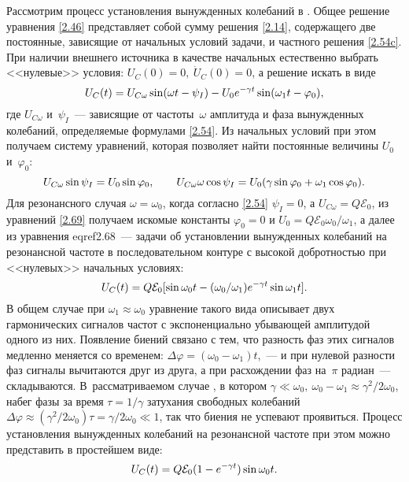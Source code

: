 Рассмотрим процесс установления вынужденных колебаний в
. Общее решение уравнения
\eqref{2.46} представляет собой сумму решения \eqref{2.14}, содержащего две
постоянные, зависящие от начальных условий задачи, и частного решения
\eqref{2.54c}. При наличии внешнего источника в качестве начальных естественно
выбрать <<нулевые>> условия: $U_C(0)=0,~\dot U_C(0)=0$, а решение искать в виде
\begin{equation}
	\eqmark{2.68}
	U_C(t)=U_{C\omega}\sin(\omega t-\psi_I)-U_0e^{-\gamma
t}\sin(\omega_1t-\varphi_0),
\end{equation}
где $U_{C\omega}$ и~$\psi_I$~--- зависящие от частоты~$\omega$ амплитуда и фаза
вынужденных колебаний, определяемые формулами \eqref{2.54}. Из начальных условий
при этом получаем систему уравнений, которая позволяет найти постоянные величины
$U_0$ и~$\varphi_0$:
\begin{equation}
	\eqmark{2.69}
	U_{C\omega}\sin\psi_I=U_0\sin\varphi_0, \qquad
U_{C\omega}\omega\cos\psi_I=U_0(\gamma\sin\varphi_0+\omega_1\cos\varphi_0).
\end{equation}
Для резонансного случая $\omega=\omega_0$, когда согласно \eqref{2.54}
$\psi_I=0$, а $U_{C\omega}=Q\mathcal{E}_0$, из уравнений \eqref{2.69} получаем
искомые константы $\varphi_0=0$ и $U_0=Q\mathcal{E}_0\omega_0/\omega_1$, а далее
из уравнения eqref{2.68}~---  задачи об установлении
вынужденных колебаний на резонансной частоте в последовательном контуре с
высокой добротностью при <<нулевых>> начальных условиях:
\begin{equation}
	\eqmark{2.70}
	U_{C}(t)=Q\mathcal{E}_0[\sin\omega_0t-(\omega_0/\omega_1)e^{-\gamma
t}\sin\omega_1 t].
\end{equation}
В общем случае при $\omega_1\approx\omega_0$ уравнение такого вида описывает
 двух гармонических сигналов  частот с
экспоненциально убывающей амплитудой одного из них. Появление биений связано с
тем, что разность фаз этих сигналов медленно меняется со временем:
$\Delta\varphi=(\omega_0-\omega_1)t$,~--- и при нулевой разности фаз сигналы
вычитаются друг из друга, а при расхождении фаз на~$\pi$
радиан~--- складываются. В~рассматриваемом случае , в котором
$\gamma\ll\omega_0,~\omega_0-\omega_1\approx\gamma^2/2\omega_0$, набег фазы за
время $\tau=1/\gamma$ затухания свободных колебаний
$\Delta\varphi\approx(\gamma^2/2\omega_0)\tau=\gamma/2\omega_0\ll1$,  так что
биения не успевают проявиться. Процесс установления вынужденных колебаний на
резонансной частоте при этом можно представить в простейшем виде:
\begin{equation}\eqmark{2.71}
	U_C(t)=Q\mathcal{E}_0(1-e^{-\gamma t})\sin\omega_0 t.
\end{equation}

